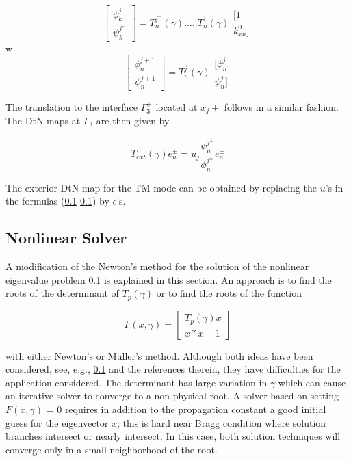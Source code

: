 \begin{equation}
\left[ \begin{array}{ll} \phi_k^{j^-} \\ \psi_k^{j^-}
\end{array} \right] = T_n^{j^-}(\gamma) ..... T_n^1(\gamma)
\begin{array}{ll} [1 \\ k_{xn}^0] \end{array}
\end{equation}
w\begin{equation}
\left[ \begin{array}{ll} \phi_n^{j+1} \\ \psi_n^{j+1}
\end{array} \right] = T_n^j(\gamma)
\begin{array}{ll} [\phi_n^{j} \\ \psi_n^{j}] \end{array}
\end{equation}

The translation to the interface $\Gamma_3^+$ located at $x_j+$
follows in a similar fashion. The DtN maps at $\Gamma_3$ are then
given by 

\begin{equation}
T_{ext}(\gamma) e_n^\pm = u_j \frac{\psi_n^{j^\pm}}{\phi_n^{j^\pm}} e_n^\pm
\end{equation}

The exterior DtN map for the TM mode can be obtained by replacing the
$u$'s in the formulas (\ref{}-\ref{}) by $\epsilon$'s.

\subsection{Nonlinear Solver}
A modification of the Newton's method for the solution of the
nonlinear eigenvalue problem \ref{} is explained in this section. An
approach is to find the roots of the determinant of $T_p(\gamma)$ or
to find the roots of the function

\begin{equation}
F(x,\gamma) = \left[ \begin{array}{cc} T_p(\gamma)x \\
x*x-1 \end{array} \right]
\end{equation}

with either Newton's or Muller's method. Although both ideas have been
considered, see, e.g., \ref{} and the references therein, they have
difficulties for the application considered. The determinant has large
variation in $\gamma$ which can cause an iterative solver to converge
to a non-physical root. A solver based on setting $F(x,\gamma)$ = 0
requires in addition to the propagation constant a good initial guess
for the eigenvector $x$; this is hard near Bragg condition where
solution branches intersect or nearly intersect. In this case, both
solution techniques will converge only in a small neighborhood of the
root.

